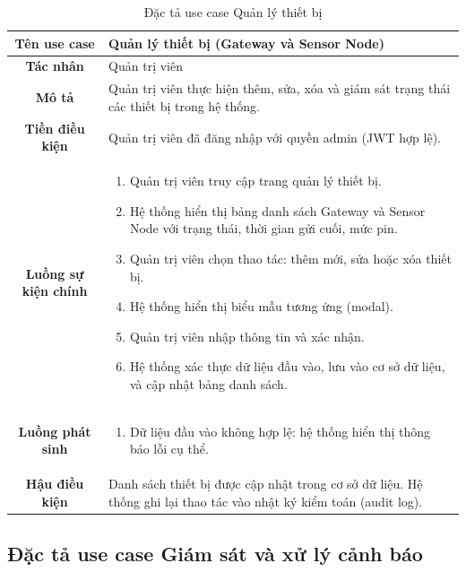 \documentclass[../DoAn.tex]{subfiles}
\begin{document}
\begin{table}[H]
\centering
\caption{Đặc tả use case Quản lý thiết bị}
\label{table:uc_device}
\small
\begin{tabularx}{\textwidth}{|c|X|}
\hline
\textbf{Tên use case} & Quản lý thiết bị (Gateway và Sensor Node) \\
\hline
\textbf{Tác nhân} & Quản trị viên \\
\hline
\textbf{Mô tả} & Quản trị viên thực hiện thêm, sửa, xóa và giám sát trạng thái các thiết bị trong hệ thống. \\
\hline
\textbf{Tiền điều kiện} & Quản trị viên đã đăng nhập với quyền admin (JWT hợp lệ). \\
\hline
\textbf{Luồng sự kiện chính} &
\begin{enumerate}[leftmargin=*, nosep]
    \item Quản trị viên truy cập trang quản lý thiết bị.
    \item Hệ thống hiển thị bảng danh sách Gateway và Sensor Node với trạng thái, thời gian gửi cuối, mức pin.
    \item Quản trị viên chọn thao tác: thêm mới, sửa hoặc xóa thiết bị.
    \item Hệ thống hiển thị biểu mẫu tương ứng (modal).
    \item Quản trị viên nhập thông tin và xác nhận.
    \item Hệ thống xác thực dữ liệu đầu vào, lưu vào cơ sở dữ liệu, và cập nhật bảng danh sách.
\end{enumerate} \\
\hline
\textbf{Luồng phát sinh} &
\begin{enumerate}[leftmargin=*, nosep]
    \item[6a.] Dữ liệu đầu vào không hợp lệ: hệ thống hiển thị thông báo lỗi cụ thể.
\end{enumerate} \\
\hline
\textbf{Hậu điều kiện} & Danh sách thiết bị được cập nhật trong cơ sở dữ liệu. Hệ thống ghi lại thao tác vào nhật ký kiểm toán (audit log). \\
\hline
\end{tabularx}
\end{table}

\subsection{Đặc tả use case Giám sát và xử lý cảnh báo}
\label{subsection:2.3.4}
\end{document}
